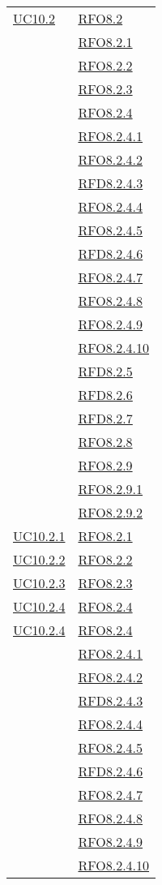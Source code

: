 \begin{longtable}{|>{\centering}m{5cm}|m{5cm}<{\centering}|}
\hyperlink{UC10.2}{UC10.2} 
& \hyperlink{RFO8.2}{RFO8.2}\\
& \hyperlink{RFO8.2.1}{RFO8.2.1}\\
& \hyperlink{RFO8.2.2}{RFO8.2.2}\\
& \hyperlink{RFO8.2.3}{RFO8.2.3}\\
& \hyperlink{RFO8.2.4}{RFO8.2.4}\\
& \hyperlink{RFO8.2.4.1}{RFO8.2.4.1}\\
& \hyperlink{RFO8.2.4.2}{RFO8.2.4.2}\\
& \hyperlink{RFD8.2.4.3}{RFD8.2.4.3}\\
& \hyperlink{RFO8.2.4.4}{RFO8.2.4.4}\\
& \hyperlink{RFO8.2.4.5}{RFO8.2.4.5}\\
& \hyperlink{RFD8.2.4.6}{RFD8.2.4.6}\\
& \hyperlink{RFO8.2.4.7}{RFO8.2.4.7}\\
& \hyperlink{RFO8.2.4.8}{RFO8.2.4.8}\\
& \hyperlink{RFO8.2.4.9}{RFO8.2.4.9}\\
& \hyperlink{RFO8.2.4.10}{RFO8.2.4.10}\\
& \hyperlink{RFD8.2.5}{RFD8.2.5}\\
& \hyperlink{RFD8.2.6}{RFD8.2.6}\\
& \hyperlink{RFD8.2.7}{RFD8.2.7}\\
& \hyperlink{RFO8.2.8}{RFO8.2.8}\\
& \hyperlink{RFO8.2.9}{RFO8.2.9}\\
& \hyperlink{RFO8.2.9.1}{RFO8.2.9.1}\\
& \hyperlink{RFO8.2.9.2}{RFO8.2.9.2}\\\hline

\hyperlink{UC10.2.1}{UC10.2.1} & \hyperlink{RFO8.2.1}{RFO8.2.1}\\\hline
\hyperlink{UC10.2.2}{UC10.2.2} & \hyperlink{RFO8.2.2}{RFO8.2.2}\\\hline
\hyperlink{UC10.2.3}{UC10.2.3} & \hyperlink{RFO8.2.3}{RFO8.2.3}\\\hline
\hyperlink{UC10.2.4}{UC10.2.4} & \hyperlink{RFO8.2.4}{RFO8.2.4}\\\hline

\hyperlink{UC10.2.4}{UC10.2.4} 
& \hyperlink{RFO8.2.4}{RFO8.2.4}\\
& \hyperlink{RFO8.2.4.1}{RFO8.2.4.1}\\
& \hyperlink{RFO8.2.4.2}{RFO8.2.4.2}\\
& \hyperlink{RFD8.2.4.3}{RFD8.2.4.3}\\
& \hyperlink{RFO8.2.4.4}{RFO8.2.4.4}\\
& \hyperlink{RFO8.2.4.5}{RFO8.2.4.5}\\
& \hyperlink{RFD8.2.4.6}{RFD8.2.4.6}\\
& \hyperlink{RFO8.2.4.7}{RFO8.2.4.7}\\
& \hyperlink{RFO8.2.4.8}{RFO8.2.4.8}\\
& \hyperlink{RFO8.2.4.9}{RFO8.2.4.9}\\
& \hyperlink{RFO8.2.4.10}{RFO8.2.4.10}\\\hline


\end{longtable}
